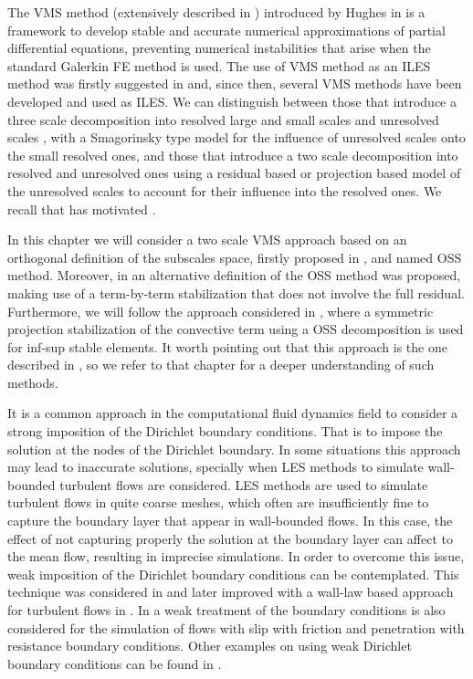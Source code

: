 The VMS method (extensively described in ) introduced by Hughes in \cite{hughes_multiscale_1995,hughes_variational_1998} is a framework to develop stable and accurate numerical approximations of partial differential equations, preventing numerical instabilities that arise when the standard Galerkin FE method is used. The use of VMS method as an ILES method was firstly suggested in \cite{hughes_multiscale_2001,hughes_large_2001,codina_stabilized_2002} and, since then, several VMS methods have been developed and used as ILES. We can distinguish between those that introduce a three scale decomposition into resolved large and small scales and unresolved scales \cite{koobus_variational_2004,john_variants_2008, john_numerical_2010, masud_variational_2011}, with a Smagorinsky type model for the influence of unresolved scales onto the small resolved ones, and those that introduce a two scale decomposition into resolved and unresolved ones \cite{bazilevs_variational_2007,colomes_assessment_2015} using a residual based or projection based model of the unresolved scales to account for their influence into the resolved ones. We recall that \cite{colomes_assessment_2015} has motivated .

In this chapter we will consider a two scale VMS approach based on an orthogonal definition of the subscales space, firstly proposed in \cite{codina_stabilization_2000}, and named OSS method. Moreover, in \cite{codina_analysis_2008} an alternative definition of the OSS method was proposed, making use of a term-by-term stabilization that does not involve the full residual. Furthermore, we will follow the approach considered in \cite{colomes_mixed_2015}, where a symmetric projection stabilization of the convective term using a OSS decomposition is used for inf-sup stable elements. It worth pointing out that this approach is the one described in , so we refer to that chapter for a deeper understanding of such methods.

It is a common approach in the computational fluid dynamics field to consider a strong imposition of the Dirichlet boundary conditions. That is to impose the solution at the nodes of the Dirichlet boundary. In some situations this approach may lead to inaccurate solutions, specially when LES methods to simulate wall-bounded turbulent flows are considered. LES methods are used to simulate turbulent flows in quite coarse meshes, which often are insufficiently fine to capture the boundary layer that appear in wall-bounded flows. In this case, the effect of not capturing properly the solution at the boundary layer can affect to the mean flow, resulting in imprecise simulations. In order to overcome this issue, weak imposition of the Dirichlet boundary conditions can be contemplated. This technique was considered in \cite{bazilevs_weak_2007-1} and later improved with a wall-law based approach for turbulent flows in \cite{bazilevs_weak_2007}. In \cite{john_slip_2002} a weak treatment of the boundary conditions is also considered for the simulation of flows with slip with friction and penetration with resistance boundary conditions. Other examples on using weak Dirichlet boundary conditions can be found in \cite{davidson_lesfoil:_2000}.

